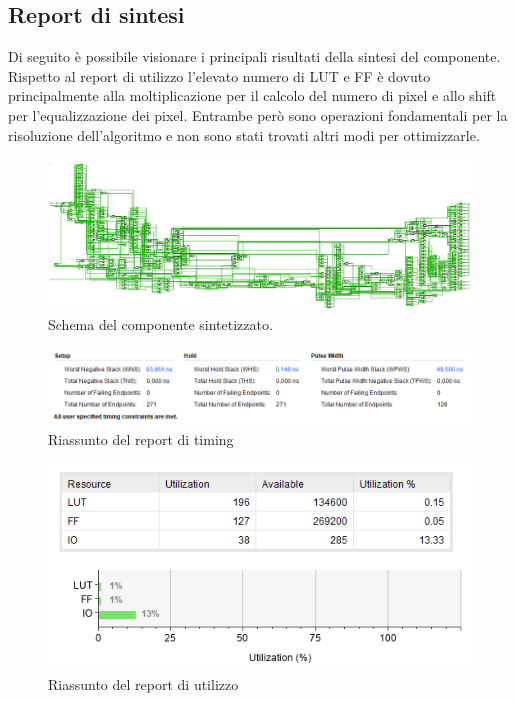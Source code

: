 \documentclass{article}
\begin{document}
\pagebreak

\subsection{Report di sintesi}
Di seguito è possibile visionare i principali risultati della sintesi del componente. Rispetto al report di utilizzo l'elevato numero di LUT e FF è dovuto principalmente alla moltiplicazione per il calcolo del numero di pixel e allo shift per l'equalizzazione dei pixel. Entrambe però sono operazioni fondamentali per la risoluzione dell'algoritmo e non sono stati trovati altri modi per ottimizzarle.

\begin{figure}[h]
    \vspace{0.1cm}
    \includegraphics[width=\textwidth]{schema.png}
    \centering
    \caption{Schema del componente sintetizzato.}
\end{figure}

\begin{figure}[h]
    \vspace{0.4cm}
    \includegraphics[width=\textwidth]{timing.png}
    \centering
    \caption{Riassunto del report di timing}
\end{figure}

\begin{figure}[h]
    \vspace{0.4cm}
    \includegraphics[scale=0.5]{utilization.png}
    \centering
    \caption{Riassunto del report di utilizzo}
\end{figure}
\end{document}
